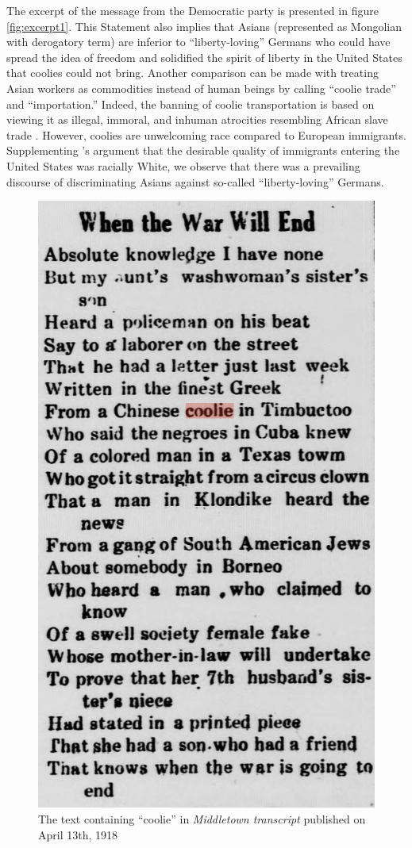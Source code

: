 \documentclass[11pt]{article}
\begin{document}
The excerpt of the message from the Democratic party is presented in figure \ref{fig:excerpt1}.
This Statement also implies that Asians (represented as Mongolian with derogatory term) are
inferior to ``liberty-loving'' Germans who could have spread the idea of freedom and solidified
the spirit of liberty in the United States that coolies could not bring. 
Another comparison can be made with treating Asian workers as commodities instead of
human beings by calling ``coolie trade'' and ``importation.''
Indeed, the banning of coolie transportation is based on viewing it as 
illegal, immoral, and inhuman atrocities resembling African slave trade \cite{jung2006coolies}.
However, coolies are unwelcoming race compared to European immigrants.
Supplementing \citet{lee2002chinese}'s argument that the desirable quality of 
immigrants entering the United States was racially White, we observe that there was a prevailing discourse
of discriminating Asians against so-called ``liberty-loving'' Germans. 

\begin{figure}[h!]
  \centering
  \includegraphics[width=0.70\columnwidth]{excerpt2.png}
  \caption{The text containing ``coolie'' in \textit{Middletown transcript} published on April 13th, 1918}
  \label{fig:excerpt2}
\end{figure}
\end{document}
